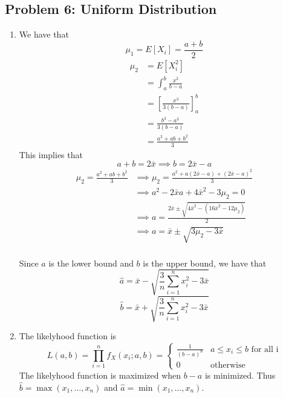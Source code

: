 \documentclass{article}
\begin{document}
\subsection*{Problem 6: Uniform Distribution}
\begin{enumerate}
	\item We have that 
	\[
		\mu_1 = E[X_i] = \frac{a+b}{2}
	\]
	\begin{align*}
		\mu_2 &= E[X_i^2] \\
		&= \int_a^b \frac{x^2}{b-a} \\
		&= \left[\frac{x^3}{3(b-a)}\right]_a^b \\
		&= \frac{b^3-a^3}{3(b-a)}  \\
		&= \frac{a^2+ab+b^2}{3} 
	\end{align*}
	This implies that 
	\[
		a+b = 2\bar{x} \implies b = 2\bar{x} - a
	\]
	\begin{align*}
		\mu_2 = \frac{a^2+ab+b^2}{3} 
		&\implies \mu_2 = \frac{a^2+a(2\bar{x} - a)+(2\bar{x} - a)^2}{3} \\
		&\implies a^2-2\bar{x}a+4\bar{x}^2-3\mu_2 =0\\
		&\implies a = \frac{2\bar{x} \pm \sqrt{4\bar{x}^2-(16\bar{x}^2 -12\mu_2)}}{2} \\
		&\implies a = \bar{x} \pm \sqrt{3\mu_2-3\bar{x}} \\
	\end{align*}

	Since $a$ is the lower bound and $b$ is the upper bound,
	we have that 
	\[
		\hat{a} = \bar{x} - \sqrt{\frac{3}{n}\sum_{i=1}^n x_i^2 -3\bar{x}}
	\]
	\[
		\hat{b} = \bar{x} + \sqrt{\frac{3}{n}\sum_{i=1}^n x_i^2-3\bar{x}}
	\]
	\item The likelyhood function is
	\[	
		L(a, b) 
		= \prod_{i=1}^n f_X(x_i;a, b)
		= \begin{cases}
			\frac{1}{(b-a)^n} & a \leq x_i \leq b \text{ for all i} \\
			0 & \text{otherwise}
		\end{cases}
	\]
	The likelyhood function is maximized when $b-a$ is minimized.
	Thus $\hat{b} = \max(x_1,\hdots,x_n)$ and $\hat{a} = \min(x_1,\hdots,x_n)$.

	
		
	
\end{enumerate}
\end{document}
